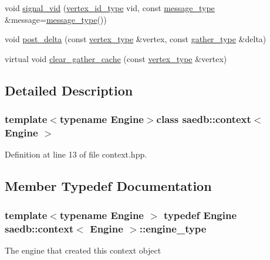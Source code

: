 \begin{DoxyCompactItemize}
void \hyperlink{classsaedb_1_1context_a64e80cac06f3df77ca818d760c05d6c6}{signal\-\_\-vid} (\hyperlink{classsaedb_1_1context_aba9540d1189edf19f3d1cb7363b5c40b}{vertex\-\_\-id\-\_\-type} vid, const \hyperlink{classsaedb_1_1context_ad29784e44db80b03b0adab9a2d8f2c72}{message\-\_\-type} \&message=\hyperlink{classsaedb_1_1context_ad29784e44db80b03b0adab9a2d8f2c72}{message\-\_\-type}())
\item 
void \hyperlink{classsaedb_1_1context_aa623eb9e9aa1fc82ff0dbffbfc80619f}{post\-\_\-delta} (const \hyperlink{classsaedb_1_1context_a62f418b2b73082cd65a88feb604bab9f}{vertex\-\_\-type} \&vertex, const \hyperlink{classsaedb_1_1context_acce022e81537ee830f3df623f4f9e0d4}{gather\-\_\-type} \&delta)
\item 
virtual void \hyperlink{classsaedb_1_1context_a1654f9e7e61601ebe886c760d4170c59}{clear\-\_\-gather\-\_\-cache} (const \hyperlink{classsaedb_1_1context_a62f418b2b73082cd65a88feb604bab9f}{vertex\-\_\-type} \&vertex)
\end{DoxyCompactItemize}


\subsection{Detailed Description}
\subsubsection*{template$<$typename Engine$>$class saedb\-::context$<$ Engine $>$}



Definition at line 13 of file context.\-hpp.



\subsection{Member Typedef Documentation}
\hypertarget{classsaedb_1_1context_a10f237a9463e78f60b333d7017cbf948}{
\subsubsection[{engine\-\_\-type}]{\setlength{\rightskip}{0pt plus 5cm}template$<$typename Engine $>$ typedef Engine {\bf saedb\-::context}$<$ Engine $>$\-::{\bf engine\-\_\-type}}}\label{d1/d89/classsaedb_1_1context_a10f237a9463e78f60b333d7017cbf948}
The engine that created this context object 

